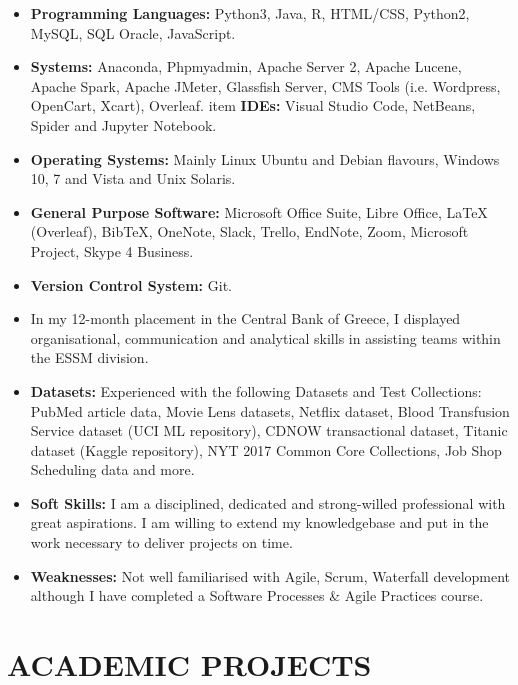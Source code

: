 \documentclass[11pt,a4paper,roman]{moderncv}
\begin{document}
\begin{itemize}
    \item \textbf{Programming Languages:} Python3, Java, R, HTML/CSS, Python2, MySQL, SQL Oracle, JavaScript.
    \item \textbf{Systems:} Anaconda, Phpmyadmin, Apache Server 2, Apache Lucene, Apache Spark, Apache JMeter, Glassfish Server, CMS Tools (i.e. Wordpress, OpenCart, Xcart), Overleaf.
    item \textbf{IDEs:} Visual Studio Code, NetBeans, Spider and Jupyter Notebook. 
    \item \textbf{Operating Systems:} Mainly Linux Ubuntu and Debian flavours, Windows 10, 7 and Vista and Unix Solaris.
    \item \textbf{General Purpose Software:} Microsoft Office Suite, Libre Office, LaTeX (Overleaf), BibTeX, OneNote, Slack, Trello, EndNote, Zoom, Microsoft Project, Skype 4 Business.
    \item \textbf{Version Control System: } Git.
    \item In my 12-month placement in the Central Bank of Greece, I displayed organisational, communication and analytical skills in assisting teams within the ESSM division.
    \item \textbf{Datasets:} Experienced with the following Datasets and Test Collections: PubMed article data, Movie Lens datasets, Netflix dataset, Blood Transfusion Service dataset (UCI ML repository), CDNOW transactional dataset, Titanic dataset (Kaggle repository), NYT 2017 Common Core Collections, Job Shop Scheduling data and more.
    \item \textbf{Soft Skills:} I am a disciplined, dedicated and strong-willed professional with great aspirations. I am willing to extend my knowledgebase and put in the work necessary to deliver projects on time. 
    \item \textbf{Weaknesses:} Not well familiarised with Agile, Scrum, Waterfall development although I have completed a Software Processes & Agile Practices course.
\end{itemize}

\section{ACADEMIC PROJECTS}
\end{document}
